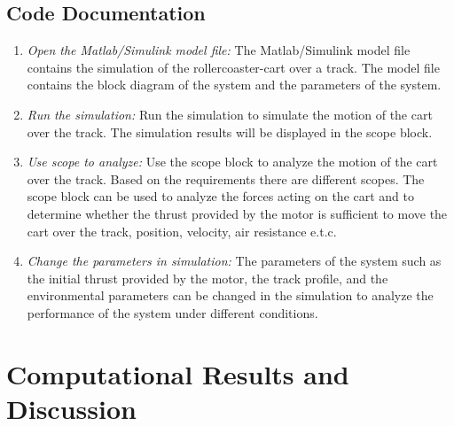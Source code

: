 \documentclass{article}
\begin{document}
    \subsection{Code Documentation}
    \begin{enumerate}
        \item \textit{Open the Matlab/Simulink model file:} The Matlab/Simulink
            model file contains the simulation of the rollercoaster-cart over a
            track. The model file contains the block diagram of the system and the
            parameters of the system.

        \item \textit{Run the simulation:} Run the simulation to simulate the
            motion of the cart over the track. The simulation results will be displayed
            in the scope block.

        \item \textit{Use scope to analyze:} Use the scope block to analyze the
            motion of the cart over the track. Based on the requirements there are
            different scopes. The scope block can be used to analyze the forces
            acting on the cart and to determine whether the thrust provided by
            the motor is sufficient to move the cart over the track, position,
            velocity, air resistance e.t.c.

        \item \textit{Change the parameters in simulation:} The parameters of
            the system such as the initial thrust provided by the motor, the track
            profile, and the environmental parameters can be changed in the
            simulation to analyze the performance of the system under different
            conditions.
    \end{enumerate}

    \section{Computational Results and Discussion}
\end{document}
